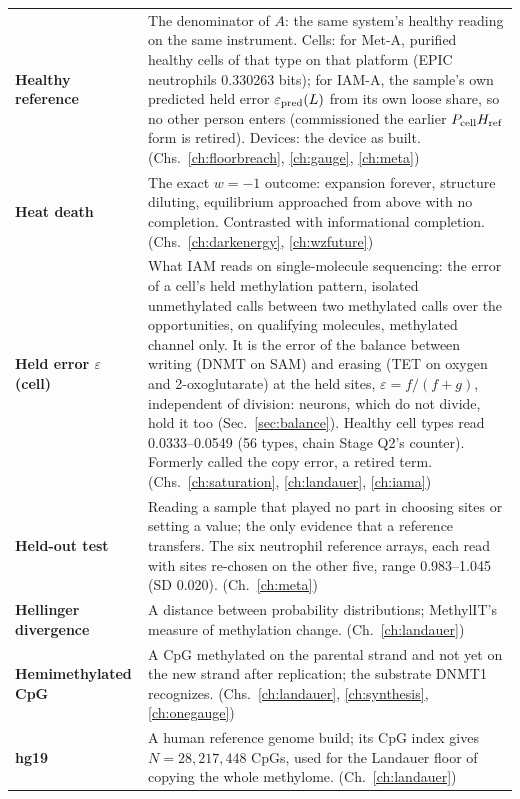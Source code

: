 {\begin{longtable}{@{}>{\raggedright\arraybackslash}p{}>{\raggedright\arraybackslash}p{}@{}}
\textbf{Healthy reference} & The denominator of $A$: the same system's healthy reading on the same instrument. Cells: for Met-A, purified healthy cells of that type on that platform (EPIC neutrophils 0.330263 bits); for IAM-A, the sample's own predicted held error $\varepsilon_{\rm pred}(L)$ from its own loose share, so no other person enters (commissioned the earlier $P_{\rm cell}H_{\rm ref}$ form is retired). Devices: the device as built. {\footnotesize(Chs.~\ref{ch:floorbreach}, \ref{ch:gauge}, \ref{ch:meta})}\\[1pt]
\textbf{Heat death} & The exact $w=-1$ outcome: expansion forever, structure diluting, equilibrium approached from above with no completion. Contrasted with informational completion. {\footnotesize(Chs.~\ref{ch:darkenergy}, \ref{ch:wzfuture})}\\[1pt]
\textbf{Held error $\varepsilon$ (cell)} & What IAM reads on single-molecule sequencing: the error of a cell's held methylation pattern, isolated unmethylated calls between two methylated calls over the opportunities, on qualifying molecules, methylated channel only. It is the error of the balance between writing (DNMT on SAM) and erasing (TET on oxygen and 2-oxoglutarate) at the held sites, $\varepsilon=f/(f+g)$, independent of division: neurons, which do not divide, hold it too (Sec.~\ref{sec:balance}). Healthy cell types read 0.0333--0.0549 (56 types, chain Stage Q2's counter). Formerly called the copy error, a retired term. {\footnotesize(Chs.~\ref{ch:saturation}, \ref{ch:landauer}, \ref{ch:iama})}\\[1pt]
\textbf{Held-out test} & Reading a sample that played no part in choosing sites or setting a value; the only evidence that a reference transfers. The six neutrophil reference arrays, each read with sites re-chosen on the other five, range 0.983--1.045 (SD 0.020). {\footnotesize(Ch.~\ref{ch:meta})}\\[1pt]
\textbf{Hellinger divergence} & A distance between probability distributions; MethylIT's measure of methylation change. {\footnotesize(Ch.~\ref{ch:landauer})}\\[1pt]
\textbf{Hemimethylated CpG} & A CpG methylated on the parental strand and not yet on the new strand after replication; the substrate DNMT1 recognizes. {\footnotesize(Chs.~\ref{ch:landauer}, \ref{ch:synthesis}, \ref{ch:onegauge})}\\[1pt]
\textbf{hg19} & A human reference genome build; its CpG index gives $N=28{,}217{,}448$ CpGs, used for the Landauer floor of copying the whole methylome. {\footnotesize(Ch.~\ref{ch:landauer})}\\[1pt]

\end{longtable}}
